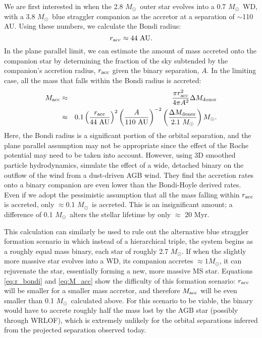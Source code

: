 \documentclass{emulateapj}
\newcommand{\Msun}{\ifmmode {M_{\odot}}\else${M_{\odot}}$\fi}
\begin{document}



We are first interested in when the 2.8 \Msun\ outer star evolves into a 0.7 \Msun\ WD, with a 3.8 \Msun\ blue straggler companion as the accretor at a separation of $\sim$110 AU. Using these numbers, we calculate the Bondi radius:
\begin{equation}
r_{\rm acc} \approx 44~ {\rm AU}.  \label{eq:r_acc_1}
\end{equation}
In the plane parallel limit, we can estimate the amount of mass accreted onto the companion star by determining the fraction of the sky subtended by the companion's accretion radius, $r_{\rm acc}$ given the binary separation, $A$. In the limiting case, all the mass that falls within the Bondi radius is accreted:
\begin{eqnarray}
M_{\rm acc} &\approx& \frac{\pi r_{\rm acc}^2}{4 \pi A^2} \Delta M_{\rm donor}  \label{eq:M_acc} \\
&\approx& 0.1 \left( \frac{r_{\rm acc}}{44~ {\rm AU}} \right)^2 \left( \frac{A}{110~{\rm AU}} \right)^{-2} \left( \frac{\Delta M_{\rm donor}}{2.1~ \Msun} \right) \Msun.
\end{eqnarray}
Here, the Bondi radius is a significant portion of the orbital separation, and the plane parallel assumption may not be appropriate since the effect of the Roche potential may need to be taken into account. However, using 3D smoothed particle hydrodynamics, \citet{mastrodemos99} simulate the effect of a wide, detached binary on the outflow of the wind from a dust-driven AGB wind. They find the accretion rates onto a binary companion are even lower than the Bondi-Hoyle derived rates. Even if we adopt the pessimistic assumption that all the mass falling within $r_{\rm acc}$ is accreted, only $\approx$0.1 \Msun\ is accreted. This is an insignificant amount; a difference of 0.1 \Msun\ alters the stellar lifetime by only $\approx$ 20 Myr. 


This calculation can similarly be used to rule out the alternative blue straggler formation scenario in which instead of a hierarchical triple, the system begins as a roughly equal mass binary, each star of roughly 2.7 \Msun. If when the slightly more massive star evolves into a WD, its companion accretes $\approx 1$\Msun, it can rejuvenate the star, essentially forming a new, more massive MS star. Equations \ref{eq:r_bondi} and \ref{eq:M_acc} show the difficulty of this formation scenario: $r_{\rm acc}$ will be smaller for a smaller mass accretor, and therefore $M_{\rm acc}$ will be even smaller than 0.1 \Msun\ calculated above. For this scenario to be viable, the binary would have to accrete roughly half the mass lost by the AGB star (possibly through WRLOF), which is extremely unlikely for the orbital separations inferred from the projected separation observed today.
\end{document}

